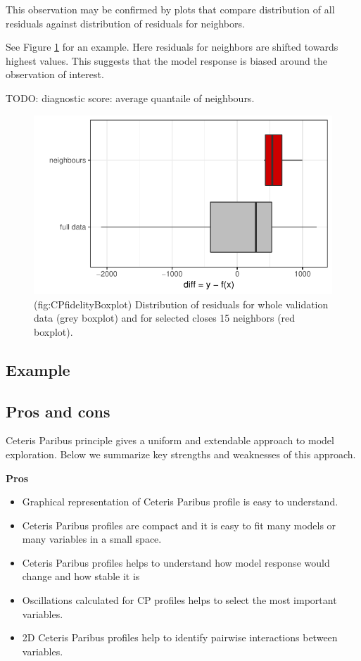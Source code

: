 \documentclass[]{krantz}
\providecommand{\tightlist}{%
  \setlength{\itemsep}{0pt}\setlength{\parskip}{0pt}}
\theoremstyle{definition}
\theoremstyle{definition}
\theoremstyle{definition}
\theoremstyle{remark}
\begin{document}
This observation may be confirmed by plots that compare distribution of
all residuals against distribution of residuals for neighbors.

See Figure \ref{fig:CPfidelityBoxplot} for an example. Here residuals
for neighbors are shifted towards highest values. This suggests that the
model response is biased around the observation of interest.

TODO: diagnostic score: average quantaile of neighbours.

\begin{figure}

{\centering \includegraphics[width=0.7\linewidth]{figure/cp_fidelity_boxplot} 

}

\caption{(fig:CPfidelityBoxplot) Distribution of residuals for whole validation data (grey boxplot) and for selected closes 15 neighbors (red boxplot).}\label{fig:CPfidelityBoxplot}
\end{figure}

\hypertarget{example}{%
\subsection{Example}\label{example}}

\hypertarget{pros-and-cons-5}{%
\subsection{Pros and cons}\label{pros-and-cons-5}}

Ceteris Paribus principle gives a uniform and extendable approach to
model exploration. Below we summarize key strengths and weaknesses of
this approach.

\textbf{Pros}

\begin{itemize}
\tightlist
\item
  Graphical representation of Ceteris Paribus profile is easy to
  understand.
\item
  Ceteris Paribus profiles are compact and it is easy to fit many models
  or many variables in a small space.
\item
  Ceteris Paribus profiles helps to understand how model response would
  change and how stable it is
\item
  Oscillations calculated for CP profiles helps to select the most
  important variables.
\item
  2D Ceteris Paribus profiles help to identify pairwise interactions
  between variables.
\end{itemize}
\end{document}
